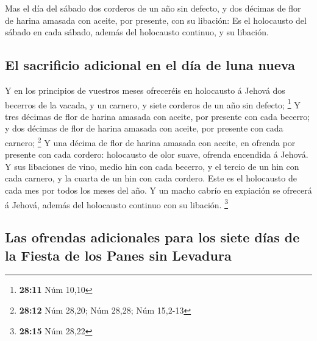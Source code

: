  Mas el día del sábado dos corderos de un año sin defecto, y
dos décimas de flor de harina amasada con aceite, por presente, con su
libación:  Es el holocausto del sábado en cada sábado,
además del holocausto continuo, y su libación.

\hypertarget{el-sacrificio-adicional-en-el-duxeda-de-luna-nueva}{%
\subsection{El sacrificio adicional en el día de luna
nueva}\label{el-sacrificio-adicional-en-el-duxeda-de-luna-nueva}}

 Y en los principios de vuestros meses ofreceréis en
holocausto á Jehová dos becerros de la vacada, y un carnero, y siete
corderos de un año sin defecto; \footnote{\textbf{28:11} Núm 10,10}
 Y tres décimas de flor de harina amasada con aceite, por
presente con cada becerro; y dos décimas de flor de harina amasada con
aceite, por presente con cada carnero; \footnote{\textbf{28:12} Núm
  28,20; Núm 28,28; Núm 15,2-13}  Y una décima de flor de
harina amasada con aceite, en ofrenda por presente con cada cordero:
holocausto de olor suave, ofrenda encendida á Jehová.  Y
sus libaciones de vino, medio hin con cada becerro, y el tercio de un
hin con cada carnero, y la cuarta de un hin con cada cordero. Este es el
holocausto de cada mes por todos los meses del año.  Y un
macho cabrío en expiación se ofrecerá á Jehová, además del holocausto
continuo con su libación. \footnote{\textbf{28:15} Núm 28,22}

\hypertarget{las-ofrendas-adicionales-para-los-siete-duxedas-de-la-fiesta-de-los-panes-sin-levadura}{%
\subsection{Las ofrendas adicionales para los siete días de la Fiesta de
los Panes sin
Levadura}\label{las-ofrendas-adicionales-para-los-siete-duxedas-de-la-fiesta-de-los-panes-sin-levadura}}

